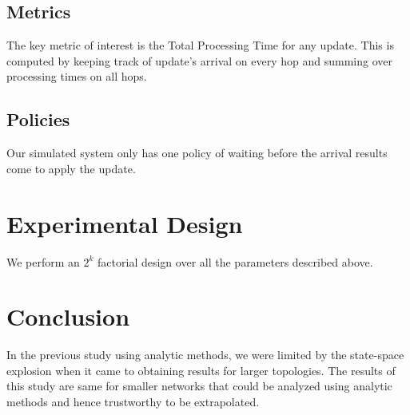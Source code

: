 \documentclass[conference]{IEEEtran}
\begin{document}
\subsection{Metrics}
The key metric of interest is the Total Processing Time for any update. This is computed by keeping track of update's arrival on every hop and summing over processing times on all hops.

\subsection{Policies}
Our simulated system only has one policy of waiting before the arrival results come to apply the update. 

\section{Experimental Design}
We perform an $2^k$ factorial design over all the parameters described above.

\section{Conclusion}
In the previous study using analytic methods, we were limited by the state-space explosion when it came to obtaining results for larger topologies. The results of this study are same for smaller networks that could be analyzed using analytic methods and hence trustworthy to be extrapolated. 
\end{document}
